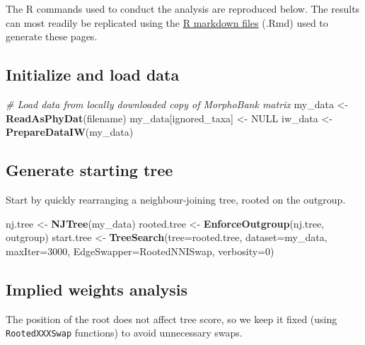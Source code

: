 \documentclass[openany]{book}
\newenvironment{Shaded}{\begin{snugshade}}{\end{snugshade}}
\newcommand{\KeywordTok}[1]{\textcolor[rgb]{0.13,0.29,0.53}{\textbf{#1}}}
\newcommand{\DataTypeTok}[1]{\textcolor[rgb]{0.13,0.29,0.53}{#1}}
\newcommand{\DecValTok}[1]{\textcolor[rgb]{0.00,0.00,0.81}{#1}}
\newcommand{\StringTok}[1]{\textcolor[rgb]{0.31,0.60,0.02}{#1}}
\newcommand{\CommentTok}[1]{\textcolor[rgb]{0.56,0.35,0.01}{\textit{#1}}}
\newcommand{\OtherTok}[1]{\textcolor[rgb]{0.56,0.35,0.01}{#1}}
\newcommand{\NormalTok}[1]{#1}
\theoremstyle{definition}
\theoremstyle{definition}
\theoremstyle{definition}
\theoremstyle{remark}
\begin{document}
The R commands used to conduct the analysis are reproduced below. The
results can most readily be replicated using the
\href{https://github.com/ms609/hyoliths/}{R markdown files} (.Rmd) used
to generate these pages.

\subsection{Initialize and load data}\label{initialize-and-load-data}

\begin{Shaded}
\begin{Highlighting}[]
\CommentTok{# Load data from locally downloaded copy of MorphoBank matrix}
\NormalTok{my_data <-}\StringTok{ }\KeywordTok{ReadAsPhyDat}\NormalTok{(filename)}
\NormalTok{my_data[ignored_taxa] <-}\StringTok{ }\OtherTok{NULL}
\NormalTok{iw_data <-}\StringTok{ }\KeywordTok{PrepareDataIW}\NormalTok{(my_data)}
\end{Highlighting}
\end{Shaded}

\subsection{Generate starting tree}\label{generate-starting-tree}

Start by quickly rearranging a neighbour-joining tree, rooted on the
outgroup.

\begin{Shaded}
\begin{Highlighting}[]
\NormalTok{nj.tree <-}\StringTok{ }\KeywordTok{NJTree}\NormalTok{(my_data)}
\NormalTok{rooted.tree <-}\StringTok{ }\KeywordTok{EnforceOutgroup}\NormalTok{(nj.tree, outgroup)}
\NormalTok{start.tree <-}\StringTok{ }\KeywordTok{TreeSearch}\NormalTok{(}\DataTypeTok{tree=}\NormalTok{rooted.tree, }\DataTypeTok{dataset=}\NormalTok{my_data, }\DataTypeTok{maxIter=}\DecValTok{3000}\NormalTok{,}
                         \DataTypeTok{EdgeSwapper=}\NormalTok{RootedNNISwap, }\DataTypeTok{verbosity=}\DecValTok{0}\NormalTok{)}
\end{Highlighting}
\end{Shaded}

\subsection{Implied weights analysis}\label{implied-weights-analysis}

The position of the root does not affect tree score, so we keep it fixed
(using \texttt{RootedXXXSwap} functions) to avoid unnecessary swaps.
\end{document}
